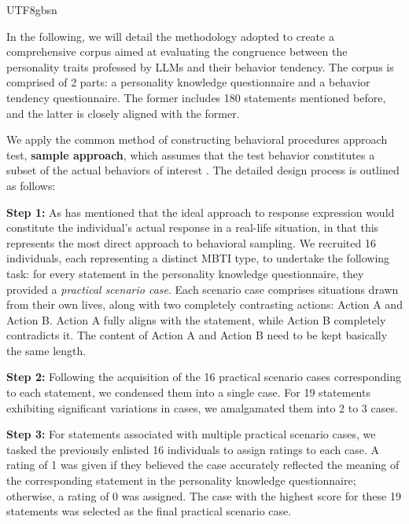\documentclass{article}
\theoremstyle{plain}
\theoremstyle{definition}
\theoremstyle{remark}
\begin{document}
\begin{CJK*}{UTF8}{gbsn}

In the following, we will detail the methodology adopted to create a comprehensive corpus aimed at evaluating the congruence between the personality traits professed by LLMs and their behavior tendency. The corpus is comprised of 2 parts: a personality knowledge questionnaire and a behavior tendency questionnaire. The former includes 180 statements mentioned before, and the latter is closely aligned with the former.

We apply the common method of constructing behavioral procedures approach test, \textbf{sample approach}, which assumes that the test behavior constitutes a subset of the actual behaviors of interest \citep{golfried1972traditional}. The detailed design process is outlined as follows:

\textbf{Step 1:} As \citet{golfried1972traditional} has mentioned that the ideal approach to response expression would constitute the individual's actual response in a real-life situation, in that this represents the most direct approach to behavioral sampling. We recruited 16 individuals, each representing a distinct MBTI type, to undertake the following task: for every statement in the personality knowledge questionnaire, they provided a \textit{practical scenario case}. Each scenario case comprises situations drawn from their own lives, along with two completely contrasting actions: Action A and Action B. Action A fully aligns with the statement, while Action B completely contradicts it. The content of Action A and Action B need to be kept basically the same length.

\textbf{Step 2:} Following the acquisition of the 16 practical scenario cases corresponding to each statement, we condensed them into a single case. For 19 statements exhibiting significant variations in cases, we amalgamated them into 2 to 3 cases. 

\textbf{Step 3:} For statements associated with multiple practical scenario cases, we tasked the previously enlisted 16 individuals to assign ratings to each case. A rating of 1 was given if they believed the case accurately reflected the meaning of the corresponding statement in the personality knowledge questionnaire; otherwise, a rating of 0 was assigned. The case with the highest score for these 19 statements was selected as the final practical scenario case.


\end{CJK*}
\end{document}
